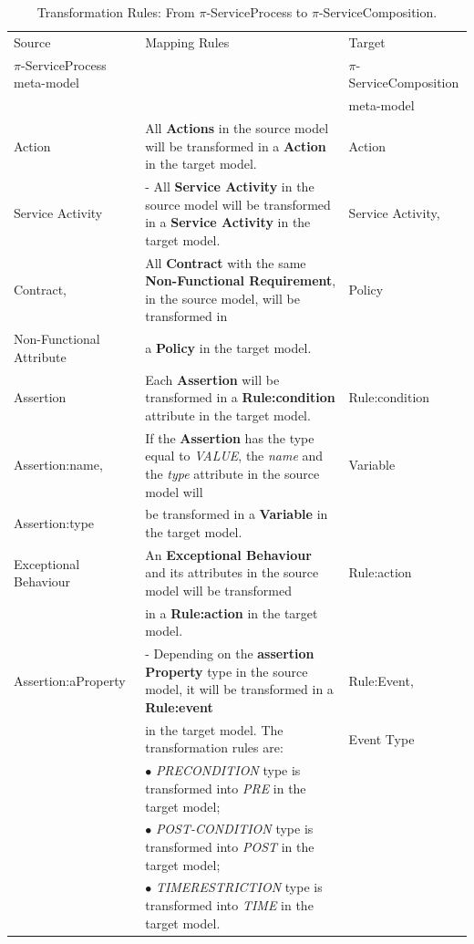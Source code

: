 \begin{table} [ht!]
\tiny
\renewcommand{\arraystretch}{1.3}
\caption{Transformation Rules: From $\pi$-ServiceProcess to
$\pi$-ServiceComposition.}
\label{tab:transformationServiceProcessToComposition}
\centering
\begin{tabular}{l|l|l}
    \hline
    Source  &  Mapping Rules & Target\\
    $\pi$-ServiceProcess meta-model &   & $\pi$-ServiceComposition\\
      &&  meta-model\\
    \hline
    \hline

   Action & All \textbf{Actions} in the source model will be
   transformed in a \textbf{Action} in the target model. &Action\\
   \hline
   Service Activity&  - All \textbf{Service Activity} in the source model will
   be transformed in a \textbf{Service Activity} in the target model. &Service Activity,\\
   \hline
   Contract, & All \textbf{Contract} with the same \textbf{Non-Functional
   Requirement}, in the source model, will be transformed in& Policy\\
   Non-Functional Attribute&  a \textbf{Policy} in the target
   model.&\\
   \hline
   Assertion & Each \textbf{Assertion} will be transformed in a
   \textbf{Rule:condition} attribute in the target model. & Rule:condition\\
   \hline

   Assertion:name, & If the \textbf{Assertion} has the type equal to
   \textit{VALUE}, the \textit{name} and the \textit{type} attribute in the source
   model will & Variable\\
   Assertion:type & be transformed in a \textbf{Variable} in the target model.&
   \\
   \hline
   Exceptional Behaviour & An \textbf{Exceptional Behaviour} and its attributes in
   the source model will be transformed & Rule:action\\
   &in a \textbf{Rule:action} in the target model. &\\
   \hline
   Assertion:aProperty &- Depending on the \textbf{assertion Property} type in
   the source model, it will be transformed in a \textbf{Rule:event}&
   Rule:Event,\\ & in the target model. The transformation rules
    are:& Event Type\\
    &$\bullet$ \textit{PRECONDITION} type is transformed into \textit{PRE}
    in the target model;&\\
    &$\bullet$ \textit{POST-CONDITION} type is transformed into \textit{POST} in
    the target model;&\\
    &$\bullet$ \textit{TIMERESTRICTION} type is transformed into \textit{TIME}
    in the target model.&\\
   \hline


\end{tabular}
\end{table}
